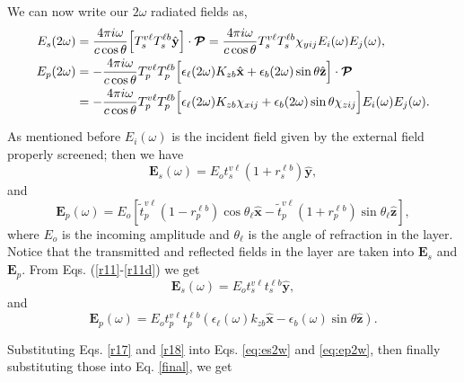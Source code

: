 \documentclass{article}
\begin{document}
We can now write our $2\omega$ radiated fields as,
\begin{align}
E_{s}(2\omega) &= \frac{4\pi i \omega}{c\cos\theta}\Bigl[T_{s}^{v\ell}T_{s}^{\ell b}\hat{\mathbf{y}}\Bigr]\cdot\boldsymbol{\mathcal{P}} = \frac{4\pi i \omega}{c\cos\theta}T_{s}^{v\ell}T_{s}^{\ell b}\chi_{yij}E_{i}(\omega)E_{j}(\omega),\label{eq:es2w}\\
E_{p}(2\omega) &= -\frac{4\pi i \omega}{c\cos\theta}T_{p}^{v\ell}T_{p}^{\ell b}\Bigl[\epsilon_{\ell}(2\omega)K_{zb}\hat{\mathbf{x}} + \epsilon_{b}(2\omega)\sin\theta\hat{\mathbf{z}}\Bigr]\cdot\boldsymbol{\mathcal{P}}\nonumber\\
&= -\frac{4\pi i \omega}{c\cos\theta}T_{p}^{v\ell}T_{p}^{\ell b}\Bigl[\epsilon_{\ell}(2\omega)K_{zb}\chi_{xij} + \epsilon_{b}(2\omega)\sin\theta\chi_{zij}\Bigr]E_{i}(\omega)E_{j}(\omega).\label{eq:ep2w}
\end{align}

As mentioned before $E_{i}(\omega)$ is the incident field given by the external
field properly screened; then we have
\begin{equation}\label{r15}
\mathbf{E}_{s}(\omega)=E_{o} t_{s}^{v\ell}\left(1 + r_{s}^{\ell b}\right)\hat{\mathbf{y}},
\end{equation}
and
\begin{equation}\label{r16}
\mathbf{E}_{p}(\omega)=E_{o}\left[
\tilde{t}_p^{v\ell}\left(1-r_p^{\ell b}\right)\cos\theta_\ell\hat{\mathbf{x}}
-\tilde{t}_p^{v\ell}\left(1+r_p^{\ell
b}\right)\sin\theta_\ell\hat{\mathbf{z}}\right],
 \end{equation}
where $E_{o}$ is the incoming amplitude and $\theta_\ell$ is the angle of
refraction in the layer. Notice that the transmitted and reflected fields in
the layer are taken into $\mathbf{E}_{s}$ and $\mathbf{E}_{p}$. From Eqs.
(\ref{r11}-\ref{r11d}) we get
\begin{equation}\label{r17}
\mathbf{E}_{s}(\omega)=E_{o} t_s^{v\ell}t_s^{\ell b}\hat{\mathbf{y}},
\end{equation}
and
\begin{equation}\label{r18}
\mathbf{E}_{p}(\omega)=E_{o} t_p^{v\ell}t_p^{\ell b}\left(\epsilon_{\ell}(\omega)k_{zb}\hat{\mathbf{x}} - \epsilon_{b}(\omega)\sin\theta\hat{\mathbf{z}}\right).
\end{equation}

Substituting Eqs. \eqref{r17} and \eqref{r18} into Eqs. \eqref{eq:es2w} and \eqref{eq:ep2w}, then finally substituting those into Eq. \eqref{final}, we get
\end{document}
